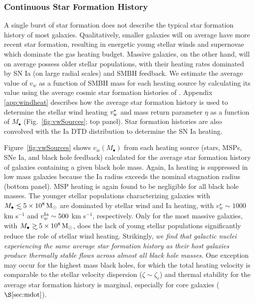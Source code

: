 \documentclass[usenatbib,fleqn]{mn2e}
\newcommand\lsim{\mathrel{\rlap{\lower4pt\hbox{\hskip1pt$\sim$}}
    \raise1pt\hbox{$<$}}}
\newcommand\gsim{\mathrel{\rlap{\lower4pt\hbox{\hskip1pt$\sim$}}
    \raise1pt\hbox{$>$}}}
\newcommand{\Mbh}[1][]{M_{\bullet#1}}
\newcommand{\vwO}{v_{w}}
\begin{document}
\subsubsection{Continuous Star Formation History}
A single burst of star formation does not describe the typical star
formation history of most galaxies.  Qualitatively, smaller galaxies
will on average have more recent star formation, resulting in
energetic young stellar winds and supernovae which dominate the gas
heating budget.  Massive galaxies, on the other hand, will on average
possess older stellar populations, with their heating rates dominated
by SN Ia (on large radial scales) and SMBH feedback.  We estimate the
average value of $\vwO$ as a function of SMBH mass for each heating
source by calculating its value using the average cosmic star
formation histories of \citet{MosterNaab+:2013a}.  Appendix
\ref{app:windheat} describes how the average star formation history is
used to determine the stellar wind heating $v_{\rm w}^{\star}$ and
mass return parameter $\eta$ as a function of $M_{\bullet}$
(Fig.~\ref{fig:vwSources}; top panel).  Star formation histories are also
convolved with the Ia DTD distribution to determine the SN Ia heating.

Figure~\ref{fig:vwSources} shows $\vwO(M_{\bullet})$ from each heating
source (stars, MSPs, SNe Ia, and black hole feedback) calculated for
the average star formation history of galaxies containing a given
black hole mass.  Again, Ia heating is suppressed in low mass galaxies
because the Ia radius exceeds the nominal stagnation radius (bottom
panel).  MSP heating is again found to be negligible for all black
hole masses.  The younger stellar populations characterizing galaxies
with $\Mbh\lsim 5\times 10^{8} \Msun$ are dominated by stellar wind
and Ia heating, with $v_{w}^{\star} \sim 1000$ km s$^{-1}$ and
$v_w^{\rm Ia} \sim 500$ km s$^{-1}$, respectively.  Only for the most
massive galaxies, with $\Mbh\gsim 5\times 10^{8} \Msun$, does the lack
of young stellar populations significantly reduce the role of stellar
wind
heating.  %
Strikingly, {\it we find that galactic nuclei experiencing the same
  average star formation history as their host galaxies produce
  thermally stable flows across almost all black hole masses}.  One exception may occur for the highest mass black holes, for which the total heating velocity is comparable to the stellar velocity dispersion ($\zeta \sim \zeta_c$) and thermal stability for the average star formation history is marginal, especially for core galaxies ($\S\ref{sec:mdot}$).
\end{document}
